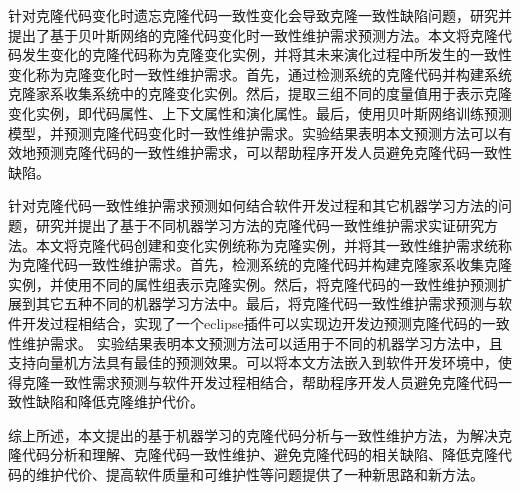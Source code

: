 {%
针对克隆代码变化时遗忘克隆代码一致性变化会导致克隆一致性缺陷问题，研究并提出了基于贝叶斯网络的克隆代码变化时一致性维护需求预测方法。本文将克隆代码发生变化的克隆代码称为克隆变化实例，并将其未来演化过程中所发生的一致性变化称为克隆变化时一致性维护需求。首先，通过检测系统的克隆代码并构建系统克隆家系收集系统中的克隆变化实例。然后，提取三组不同的度量值用于表示克隆变化实例，即代码属性、上下文属性和演化属性。最后，使用贝叶斯网络训练预测模型，并预测克隆代码变化时一致性维护需求。实验结果表明本文预测方法可以有效地预测克隆代码的一致性维护需求，可以帮助程序开发人员避免克隆代码一致性缺陷。


针对克隆代码一致性维护需求预测如何结合软件开发过程和其它机器学习方法的问题，研究并提出了基于不同机器学习方法的克隆代码一致性维护需求实证研究方法。本文将克隆代码创建和变化实例统称为克隆实例，并将其一致性维护需求统称为克隆代码一致性维护需求。首先，检测系统的克隆代码并构建克隆家系收集克隆实例，并使用不同的属性组表示克隆实例。然后，将克隆代码的一致性维护预测扩展到其它五种不同的机器学习方法中。最后，将克隆代码一致性维护需求预测与软件开发过程相结合，实现了一个eclipse插件可以实现边开发边预测克隆代码的一致性维护需求。 实验结果表明本文预测方法可以适用于不同的机器学习方法中，且支持向量机方法具有最佳的预测效果。可以将本文方法嵌入到软件开发环境中，使得克隆一致性需求预测与软件开发过程相结合，帮助程序开发人员避免克隆代码一致性缺陷和降低克隆维护代价。%

综上所述，本文提出的基于机器学习的克隆代码分析与一致性维护方法，为解决克隆代码分析和理解、克隆代码一致性维护、避免克隆代码的相关缺陷、降低克隆代码的维护代价、提高软件质量和可维护性等问题提供了一种新思路和新方法。
}


